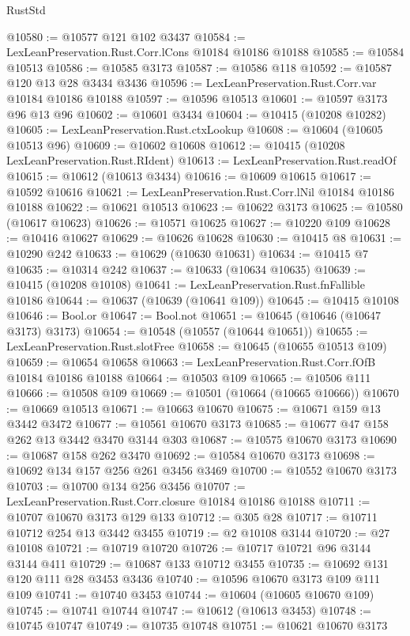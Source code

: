 \begin{lexlean}{RustStd}
\begin{coremodule}
@10580 := @10577 @121 @102 @3437
@10584 := LexLeanPreservation.Rust.Corr.lCons @10184 @10186 @10188
@10585 := @10584 @10513
@10586 := @10585 @3173
@10587 := @10586 @118
@10592 := @10587 @120 @13 @28 @3434 @3436
@10596 := LexLeanPreservation.Rust.Corr.var @10184 @10186 @10188
@10597 := @10596 @10513
@10601 := @10597 @3173 @96 @13 @96
@10602 := @10601 @3434
@10604 := @10415 (@10208 @10282)
@10605 := LexLeanPreservation.Rust.ctxLookup
@10608 := @10604 (@10605 @10513 @96)
@10609 := @10602 @10608
@10612 := @10415 (@10208 LexLeanPreservation.Rust.RIdent)
@10613 := LexLeanPreservation.Rust.readOf
@10615 := @10612 (@10613 @3434)
@10616 := @10609 @10615
@10617 := @10592 @10616
@10621 := LexLeanPreservation.Rust.Corr.lNil @10184 @10186 @10188
@10622 := @10621 @10513
@10623 := @10622 @3173
@10625 := @10580 (@10617 @10623)
@10626 := @10571 @10625
@10627 := @10220 @109
@10628 := @10416 @10627
@10629 := @10626 @10628
@10630 := @10415 @8
@10631 := @10290 @242
@10633 := @10629 (@10630 @10631)
@10634 := @10415 @7
@10635 := @10314 @242
@10637 := @10633 (@10634 @10635)
@10639 := @10415 (@10208 @10108)
@10641 := LexLeanPreservation.Rust.fnFallible @10186
@10644 := @10637 (@10639 (@10641 @109))
@10645 := @10415 @10108
@10646 := Bool.or
@10647 := Bool.not
@10651 := @10645 (@10646 (@10647 @3173) @3173)
@10654 := @10548 (@10557 (@10644 @10651))
@10655 := LexLeanPreservation.Rust.slotFree
@10658 := @10645 (@10655 @10513 @109)
@10659 := @10654 @10658
@10663 := LexLeanPreservation.Rust.Corr.fOfB @10184 @10186 @10188
@10664 := @10503 @109
@10665 := @10506 @111
@10666 := @10508 @109
@10669 := @10501 (@10664 (@10665 @10666))
@10670 := @10669 @10513
@10671 := @10663 @10670
@10675 := @10671 @159 @13 @3442 @3472
@10677 := @10561 @10670 @3173
@10685 := @10677 @47 @158 @262 @13 @3442 @3470 @3144 @303
@10687 := @10575 @10670 @3173
@10690 := @10687 @158 @262 @3470
@10692 := @10584 @10670 @3173
@10698 := @10692 @134 @157 @256 @261 @3456 @3469
@10700 := @10552 @10670 @3173
@10703 := @10700 @134 @256 @3456
@10707 := LexLeanPreservation.Rust.Corr.closure @10184 @10186 @10188
@10711 := @10707 @10670 @3173 @129 @133
@10712 := @305 @28
@10717 := @10711 @10712 @254 @13 @3442 @3455
@10719 := @2 @10108 @3144
@10720 := @27 @10108
@10721 := @10719 @10720
@10726 := @10717 @10721 @96 @3144 @3144 @411
@10729 := @10687 @133 @10712 @3455
@10735 := @10692 @131 @120 @111 @28 @3453 @3436
@10740 := @10596 @10670 @3173 @109 @111 @109
@10741 := @10740 @3453
@10744 := @10604 (@10605 @10670 @109)
@10745 := @10741 @10744
@10747 := @10612 (@10613 @3453)
@10748 := @10745 @10747
@10749 := @10735 @10748
@10751 := @10621 @10670 @3173

\end{coremodule}
\end{lexlean}

